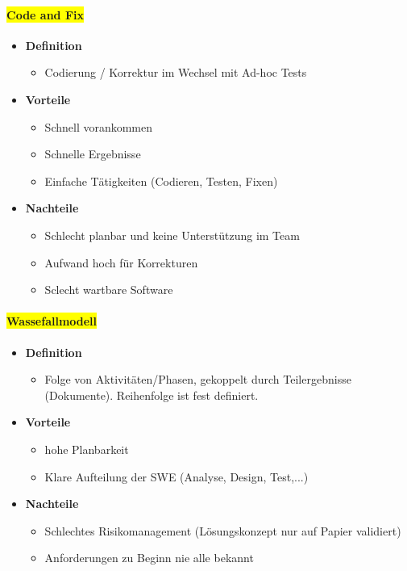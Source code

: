 \documentclass[../ZF_SWEN1.tex]{subfiles}
\begin{document}
\paragraph {\colorbox {yellow}{Code and Fix}}
\begin{itemize}
    \item \textbf {Definition}
    \begin{itemize}
        \item Codierung / Korrektur im Wechsel mit Ad-hoc Tests
    \end{itemize}
    \item \textbf{Vorteile}
    \begin{itemize}
        \item Schnell vorankommen
        \item Schnelle Ergebnisse
        \item Einfache Tätigkeiten (Codieren, Testen, Fixen)
    \end{itemize}
    \item \textbf{Nachteile}
    \begin{itemize}
        \item Schlecht planbar und keine Unterstützung im Team
        \item Aufwand hoch für Korrekturen
        \item Sclecht wartbare Software
    \end{itemize}
\end{itemize}

\paragraph {\colorbox {yellow}{Wassefallmodell}}
\begin{itemize}
    \item \textbf{Definition}
    \begin{itemize}
        \item Folge von Aktivitäten/Phasen, gekoppelt durch Teilergebnisse (Dokumente). Reihenfolge ist fest definiert.
    \end{itemize}
    \item \textbf{ Vorteile}
    \begin{itemize}
        \item hohe Planbarkeit
        \item Klare Aufteilung der SWE (Analyse, Design, Test,...)

      \end{itemize}
    \item \textbf{Nachteile}
    \begin{itemize}
        \item Schlechtes Risikomanagement (Lösungskonzept nur auf Papier validiert)
        \item Anforderungen zu Beginn nie alle bekannt
    \end{itemize}
\end{itemize}
\end{document}
